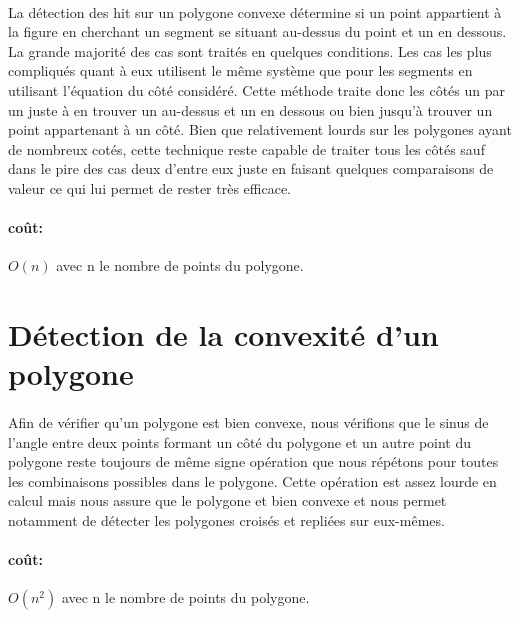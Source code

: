 \documentclass[a4paper, 12pts]{article}
\begin{document}
\paragraph{}
La détection des hit sur un polygone convexe détermine si un point appartient à la figure en cherchant un segment se situant au-dessus du point et un en dessous. La grande majorité des cas sont traités en quelques conditions. Les cas les plus compliqués quant à eux utilisent le même système que pour les segments en utilisant l'équation du côté considéré. Cette méthode traite donc les côtés un par un juste à en trouver un au-dessus et un en dessous ou bien jusqu’à trouver un point appartenant à un côté. Bien que relativement lourds sur les polygones ayant de nombreux cotés, cette technique reste capable de traiter tous les côtés sauf dans le pire des cas deux d'entre eux juste en faisant quelques comparaisons de valeur ce qui lui permet de rester très efficace.
\paragraph{coût: }
\(O(n)\) avec n le nombre de points du polygone.

\section{Détection de la convexité d'un polygone}
\paragraph{}
Afin de vérifier qu'un polygone est bien convexe, nous vérifions que le sinus de l'angle entre deux points formant un côté du polygone et un autre point du polygone reste toujours de même signe opération que nous répétons pour toutes les combinaisons possibles dans le polygone. Cette opération est assez lourde en calcul mais nous assure que le polygone et bien convexe et nous permet notamment de détecter les polygones croisés et repliées sur eux-mêmes.
\paragraph{coût: }
\(O(n^2)\) avec n le nombre de points du polygone.
\end{document}
